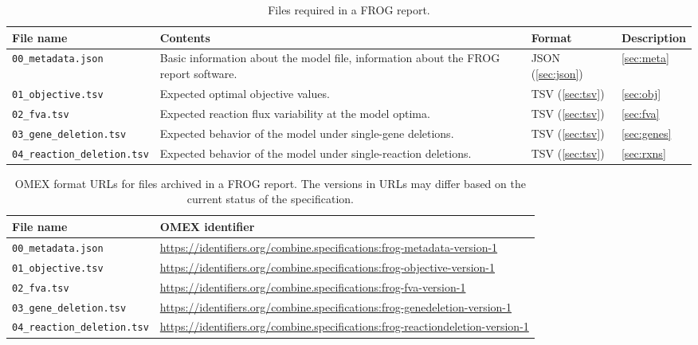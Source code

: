 \begin{table}[p]\tablefont
\begin{tabular}{lp{.3\linewidth}ll}
\toprule
File name & Contents & Format & Description \\
\midrule
\texttt{00\_metadata.json}
 & Basic information about the model file, information about the FROG report software.
 & JSON (\cref{sec:json})
 & \cref{sec:meta}
 \\\addlinespace
\texttt{01\_objective.tsv}
 & Expected optimal objective values.
 & TSV (\cref{sec:tsv})
 & \cref{sec:obj}
 \\\addlinespace
\texttt{02\_fva.tsv}
 & Expected reaction flux variability at the model optima.
 & TSV (\cref{sec:tsv})
 & \cref{sec:fva}
 \\\addlinespace
\texttt{03\_gene\_deletion.tsv}
 & Expected behavior of the model under single-gene deletions.
 & TSV (\cref{sec:tsv})
 & \cref{sec:genes}
 \\\addlinespace
\texttt{04\_reaction\_deletion.tsv}
 & Expected behavior of the model under single-reaction deletions.
 & TSV (\cref{sec:tsv})
 & \cref{sec:rxns} \\
\bottomrule
\end{tabular}
\caption{Files required in a FROG report.}
\label{tab:files}
\end{table}

\begin{table}[p]\tablefont
\begin{tabular}{lp{.6\linewidth}}
\toprule
File name & OMEX identifier \\
\midrule
\texttt{00\_metadata.json}
 & \url{https://identifiers.org/combine.specifications:frog-metadata-version-1}
 \\
\texttt{01\_objective.tsv}
 & \url{https://identifiers.org/combine.specifications:frog-objective-version-1}
 \\
\texttt{02\_fva.tsv}
 & \url{https://identifiers.org/combine.specifications:frog-fva-version-1}
 \\
\texttt{03\_gene\_deletion.tsv}
 & \url{https://identifiers.org/combine.specifications:frog-genedeletion-version-1}
 \\
\texttt{04\_reaction\_deletion.tsv}
 & \url{https://identifiers.org/combine.specifications:frog-reactiondeletion-version-1}
 \\
\bottomrule
\end{tabular}
\caption{OMEX format URLs for files archived in a FROG report. The versions in URLs may differ based on the current status of the specification.}
\label{tab:omex}
\end{table}

